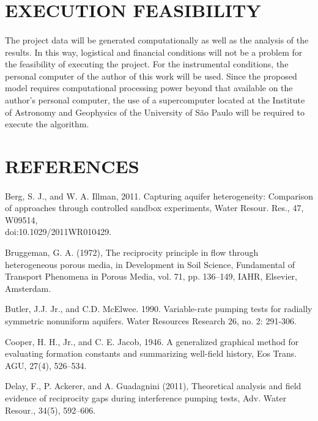 \documentclass[11pt, a4paper]{article}
\begin{document}
    
    \section{EXECUTION FEASIBILITY}
    \paragraph{}
    The project data will be generated computationally as well as the analysis of the results. In this way, logistical and financial conditions will not be a problem for the feasibility of executing the project. For the instrumental conditions, the personal computer of the author of this work will be used. Since the proposed model requires computational processing power beyond that available on the author's personal computer, the use of a supercomputer located at the Institute of Astronomy and Geophysics of the University of São Paulo will be required to execute the algorithm.
    
    \section{REFERENCES} 
    
    \paragraph{}
    Berg, S. J., and W. A. Illman, 2011. Capturing aquifer heterogeneity: Comparison of approaches through controlled sandbox experiments, Water Resour. Res., 47, W09514, \\doi:10.1029/2011WR010429.
    
    
    Bruggeman, G. A. (1972), The reciprocity principle in flow through heterogeneous porous media, in Development in Soil Science, Fundamental of Transport Phenomena in Porous Media, vol. 71, pp. 136–149, IAHR, Elsevier, Amsterdam.
    
    
    Butler, J.J. Jr., and C.D. McElwee. 1990. Variable-rate pumping tests for radially symmetric nonuniform aquifers. Water Resources Research 26, no. 2: 291-306.

    
    Cooper, H. H., Jr., and C. E. Jacob, 1946. A generalized graphical method for evaluating formation constants and summarizing well-field history, Eos Trans. AGU, 27(4), 526–534.
    
    
    Delay, F., P. Ackerer, and A. Guadagnini (2011), Theoretical analysis and field evidence of reciprocity gaps during interference pumping tests, Adv. Water Resour., 34(5), 592–606.
    
\end{document}
